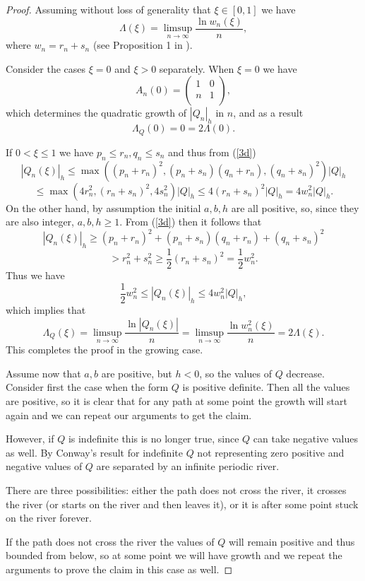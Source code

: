 \documentclass[11pt,reqno]{amsart}
\begin{document}
\begin{proof}
Assuming without loss of generality that $\xi \in [0,1]$ we have
$$
\Lambda(\xi)=\limsup_{n\to\infty}\frac{\ln w_n(\xi)}{n},
$$
where $w_n=r_n+s_n$ (see Proposition 1 in \cite{SV}).


Consider the cases $\xi=0$ and $\xi>0$ separately.
When $\xi=0$ we have
$$A_n(0)= \begin{pmatrix}
 1 & 0 \\
  n & 1 \\
\end{pmatrix},
$$ 
which determines the quadratic growth of $|Q_n|_h$ in $n$, and as a result
$$
\Lambda_Q(0)=0=2\Lambda(0).
$$

If $0<\xi\leq 1$ we have $p_n\leq r_n, q_n\leq s_n$ and thus from (\ref{3d})
$$
|Q_n(\xi)|_h \leq \max((p_n+r_n)^2, (p_n+s_n)(q_n+r_n), (q_n+s_n)^2)|Q|_h
$$
$$
\leq \max(4r_n^2, (r_n+s_n)^2, 4s_n^2)|Q|_h\leq 4(r_n+s_n)^2 |Q|_h=4w_n^2 |Q|_h.
$$
On the other hand, by assumption the initial $a,b,h$ are all positive, so, since they are also integer, $a,b,h\geq 1.$
From (\ref{3d}) then it follows that
$$
|Q_n(\xi)|_h\geq (p_n+r_n)^2+ (p_n+s_n)(q_n+r_n)+ (q_n+s_n)^2
$$
$$
>r_n^2+s_n^2 \geq \frac{1}{2}(r_n+s_n)^2=\frac{1}{2}w_n^2.
$$
Thus we have
$$
\frac{1}{2}w_n^2\leq|Q_n(\xi)|_h\leq4w_n^2 |Q|_h,
$$
which implies that
$$
\Lambda_Q(\xi)=\limsup_{n\to\infty}\frac{\ln |Q_n(\xi)|}{n}=\limsup_{n\to\infty}\frac{\ln w_n^2(\xi)}{n}=2\Lambda(\xi).
$$
This completes the proof in the growing case. 

Assume now that $a,b$ are positive, but $h<0$, so the values of $Q$ decrease.
Consider first the case when the form $Q$ is positive definite. Then all the values are positive, so it is clear that for any path at some point the growth will start again and we can repeat our arguments to get the claim.

However, if $Q$ is indefinite this is no longer true, since $Q$ can take negative values as well. By Conway's result \cite{Conway} for indefinite $Q$ not representing zero positive and negative values of $Q$ are separated by an infinite periodic river. 

There are three possibilities: either the path does not cross the river, it crosses the river (or starts on the river and then leaves it), or it is after some point stuck on the river forever.

If the path does not cross the river the values of $Q$ will remain positive and thus bounded from below, so at some point we will have growth and we repeat the arguments to prove the claim in this case as well.


\end{proof}
\end{document}
